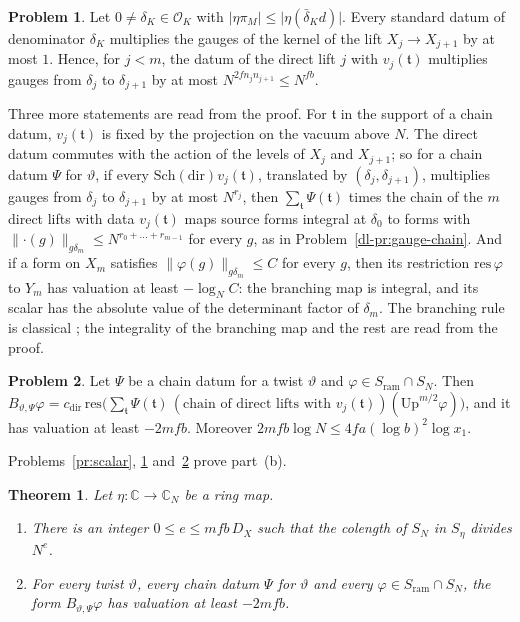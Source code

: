 \documentclass[reqno]{amsart}
\theoremstyle{plain}
\newtheorem{theorem}{Theorem}[section]
\theoremstyle{definition}
\newtheorem{problem}{Problem}[section]
\theoremstyle{remark}
\newcommand{\C}{{\mathbb{C}}}
\newcommand{\Oc}{\mathcal O}
\newcommand{\ram}{\mathrm{ram}}
\newcommand{\Up}{\mathrm{Up}}
\newcommand{\Sch}{\mathrm{Sch}}
\newcommand{\dir}{\mathrm{dir}}
\newcommand{\cdir}{c_{\mathrm{dir}}}
\newcommand{\nb}[1]{\lVert #1 \rVert}
\begin{document}
\begin{problem}\label{pr:direct-step}
Let \(0 \ne \delta_K \in \Oc_K\) with \(\lvert\eta\pi_M\rvert \le \lvert\eta(\bar{\delta}_K d)\rvert\).  Every standard datum of denominator \(\delta_K\) multiplies the gauges of the kernel of the lift \(X_j \to X_{j+1}\) by at most \(1\).  Hence, for \(j < m\), the datum of the direct lift \(j\) with \(v_j(\mathfrak t)\) multiplies gauges from \(\delta_j\) to \(\delta_{j+1}\) by at most \(N^{2fn_jn_{j+1}} \le N^{fb}\).
\end{problem}

Three more statements are read from the proof.  For \(\mathfrak t\) in the support of a chain datum, \(v_j(\mathfrak t)\) is fixed by the projection on the vacuum above \(N\).  The direct datum commutes with the action of the levels of \(X_j\) and \(X_{j+1}\); so for a chain datum \(\Psi\) for \(\vartheta\), if every \(\Sch(\dir)v_j(\mathfrak t)\), translated by \((\delta_j, \delta_{j+1})\), multiplies gauges from \(\delta_j\) to \(\delta_{j+1}\) by at most \(N^{r_j}\), then \(\sum_{\mathfrak t}\Psi(\mathfrak t)\) times the chain of the \(m\) direct lifts with data \(v_j(\mathfrak t)\) maps source forms integral at \(\delta_0\) to forms with \(\nb{\cdot(g)}_{g\delta_m} \le N^{r_0 + \dots + r_{m-1}}\) for every \(g\), as in Problem~\ref{dl-pr:gauge-chain}.  And if a form on \(X_m\) satisfies \(\nb{\varphi(g)}_{g\delta_m} \le C\) for every \(g\), then its restriction \(\mathrm{res}\,\varphi\) to \(Y_m\) has valuation at least \(-\log_N C\): the branching map is integral, and its scalar has the absolute value of the determinant factor of \(\delta_m\).  The branching rule is classical \cite[Thm.~8.1.1]{GW}; the integrality of the branching map and the rest are read from the proof.

\begin{problem}\label{pr:two-costs}
Let \(\Psi\) be a chain datum for a twist \(\vartheta\) and \(\varphi \in S_\ram \cap S_N\).  Then \(B_{\vartheta,\Psi}\varphi = \cdir\,\mathrm{res}\bigl(\sum_{\mathfrak t}\Psi(\mathfrak t)\,(\text{chain of direct lifts with } v_j(\mathfrak t))(\Up^{m/2}\varphi)\bigr)\), and it has valuation at least \(-2mfb\).  Moreover \(2mfb\log N \le 4fa(\log b)^2\log x_1\).
\end{problem}

Problems~\ref{pr:scalar}, \ref{pr:direct-step} and~\ref{pr:two-costs} prove part~(b).

\begin{theorem}\label{thm:level}
Let \(\eta\colon\C\to\C_N\) be a ring map.
\begin{enumerate}
\item[(a)] There is an integer \(0 \le e \le mfb\,D_X\) such that the colength of \(S_N\) in \(S_\eta\) divides \(N^e\).
\item[(b)] For every twist \(\vartheta\), every chain datum \(\Psi\) for \(\vartheta\) and every \(\varphi \in S_\ram \cap S_N\), the form \(B_{\vartheta,\Psi}\varphi\) has valuation at least \(-2mfb\).
\end{enumerate}
\end{theorem}
\end{document}

